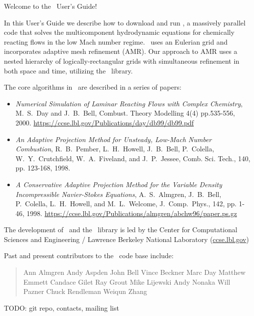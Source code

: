 Welcome to the \lmc\ User's Guide!

In this User's Guide we describe how to download and run \lmc, a
massively parallel code that solves the multicomponent hydrodynamic equations for
chemically reacting flows in the low Mach number regime.  \lmc\ uses an Eulerian grid and
incorporates adaptive mesh refinement (AMR).  Our approach to AMR uses
a nested hierarchy of logically-rectangular grids with simultaneous
refinement in both space and time, utilizing the \boxlib\ library. 

The core algorithms in \lmc\ are described in a series of papers:
\begin{itemize}
\item {\it Numerical Simulation of Laminar Reacting Flows with Complex Chemistry}, M.~S.~Day and J.~B.~Bell,
  Combust. Theory Modelling 4(4) pp.535-556, 2000.
  \url{https://ccse.lbl.gov/Publications/day/db99/db99.pdf}

\item {\it An Adaptive Projection Method for Unsteady, Low-Mach Number Combustion}, 
  R.~B.~Pember, L.~H.~Howell, J.~B.~Bell, P.~Colella, W.~Y.~Crutchfield, W.~A.~Fiveland, and J.~P.~Jessee,
  Comb. Sci. Tech., 140, pp. 123-168, 1998.

\item {\it A Conservative Adaptive Projection Method for the Variable Density Incompressible Navier-Stokes Equations},
  A.~S.~Almgren, J.~B.~Bell, P.~Colella, L.~H.~Howell, and M.~L.~Welcome, J.~Comp.~Phys., 142, pp. 1-46, 1998.
  \url{https://ccse.lbl.gov/Publications/almgren/abchw96/paper.ps.gz}

\end{itemize}         

The development of \lmc\ and the \boxlib\ library is led by the Center for Computational
Sciences and Engineering / Lawrence Berkeley National Laboratory (\url{ccse.lbl.gov})

Past and present contributors to the \lmc\ code base include: %
\begin{quote}
Ann Almgren\newline
Andy Aspden\newline
John Bell\newline
Vince Beckner\newline
Marc Day\newline
Matthew Emmett\newline
Candace Gilet\newline
Ray Grout\newline
Mike Lijewski\newline
Andy Nonaka\newline
Will Pazner\newline
Chuck Rendleman\newline
Weiqun Zhang\newline
\end{quote}

TODO: git repo, contacts, mailing list
